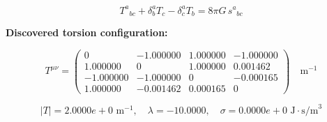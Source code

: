 
\begin{equation}
  T^a{}_{bc} + \delta^a_b T_c - \delta^a_c T_b = 8\pi G \, s^a{}_{bc}
\end{equation}

\textbf{Discovered torsion configuration:}

\begin{equation}
  T^{\mu\nu} = \begin{pmatrix}
    0 & -1.000000 & 1.000000 & -1.000000 \\
    1.000000 & 0 & 1.000000 & 0.001462 \\
    -1.000000 & -1.000000 & 0 & -0.000165 \\
    1.000000 & -0.001462 & 0.000165 & 0
  \end{pmatrix} \quad \text{m}^{-1}
\end{equation}

\begin{equation}
  |T| = 2.0000e+0 \text{ m}^{-1}, \quad
  \lambda = -10.0000, \quad
  \sigma = 0.0000e+0 \text{ J}\cdot\text{s/m}^3
\end{equation}